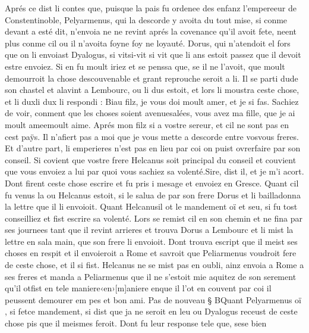 \documentclass{article}
\begin{document}
\begin{pages}
            
\pstart Aprés ce dist li contes que, 
   puisque la pais fu ordenee des enfanz 
   l’empereeur de Constentinoble, 
   Pelyarmenus, qui la descorde y avoita 
   du tout mise, si conme devant a esté dit, n’envoia ne ne revint aprés la covenance qu’il avoit fete, 
   neent plus conme cil ou il n’avoita 
   foyne foy ne loyauté. 
   Dorus, qui n’atendoit el fors que on li envoiast
   Dyalogus, si vitsi-vit si vit 
   que li ans estoit passez que il devoit estre envoiez.
   Si en fu moult iriez et se penssa que,
   se il ne l’avoit, que moult demourroit la chose descouvenable
      et grant reprouche seroit a li.
   Il se parti dude son chastel et 
   alavint a Lembourc, ou
   li dus estoit, et lors li moustra ceste chose,
   et li duxli dux li respondi :
   Biau filz, je vous doi moult amer, 
      et je si fas. Sachiez de voir, conment
      que les choses soient avenuesalées, 
      vous avez ma fille, que je 
      ai moult ameemoult aime.
      Aprés mon filz si a vostre sereur,
      et cil ne sont pas en cest paÿs. Il n’afiert pas a moi que je vous mette a descorde entre 
      vosvous freres.
      Et d’autre part, li emperieres n’est pas en lieu par coi 
      on puist ovrerfaire par son conseil. 
      Si covient que vostre frere Helcanus soit principal
      du conseil et couvient que vous envoiez a lui par quoi vous sachiez sa volenté.Sire, dist il, et je m’i acort.
   Dont firent ceste chose escrire et fu pris i mesage et envoiez en Gresce.
   Quant cil fu venus la ou Helcanus estoit, si le salua de par son frere 
   Dorus et li bailladonna 
   la lettre que il li envoioit. \pend
\pstart Quant
   Helcanusil ot le mandement oï et seu, 
   si fu tost conseilliez et fist escrire sa volenté. Lors se remist cil en son chemin et ne fina par ses journees tant 
   que il revint arrieres et trouva Dorus a Lembourc 
   et li mist la lettre en sala 
   main, que son frere li envoioit. 
   Dont trouva escript que il meist ses choses en respit et il envoieroit a Rome 
   et savroit que Peliarmenus voudroit fere de ceste chose, et il si fist. 
   Helcanus ne se mist pas en oubli, ainz envoia a Rome a 
   ses freres et manda a Peliarmenus que il ne s’estoit mie aquitez 
      de son serement qu’il otfist 
      en tele maniere‹en›[m]aniere 
      enque il l'ot en couvent 
      par coi il peussent demourer em pes et bon ami. \pend
\pstart Pas de nouveau § BQuant Pelyarmenus oï
   , si fetce mandement, si dist que 
   ja ne seroit en leu ou Dyalogus receust de ceste 
      chose pis que il meismes feroit. Dont fu leur response tele que, 
   sese bien 

\end{pages}
\end{document}
